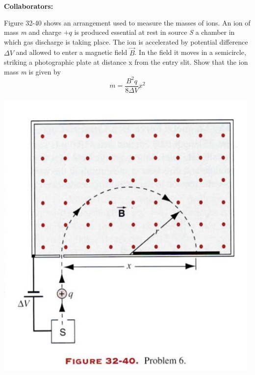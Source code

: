 \documentclass[11pt,letterpaper,boxed]{hmcpset}
\begin{document}
\noindent\textbf{Collaborators:} 


\begin{problem}[HRK P32.6]
Figure 32-40 shows an arrangement used to measure the masses of ions. An ion of mass \textit{m} and charge $+q$ is produced essential at rest in source \textit{S} a chamber in which gas discharge is taking place. The ion is accelerated by potential difference $\Delta V$ and allowed to enter a magnetic field $\vec{B}$. In the field it moves in a semicircle, striking a photographic plate at distance x from the entry slit. Show that the ion mass \textit{m} is given by
$$ m =\frac{B^2q}{8 \Delta V}x^2$$
\begin{center}
\includegraphics[scale=.6]{32-40.png}
\end{center} 
\end{problem}

\begin{solution}
\vfill
\end{solution}
\newpage
\end{document}
